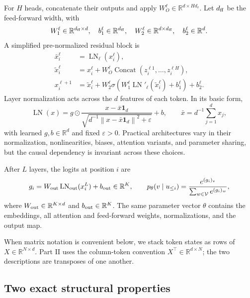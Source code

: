 \documentclass[11pt]{amsart}
\numberwithin{equation}{section}
\theoremstyle{definition}
\theoremstyle{plain}
\theoremstyle{remark}
\newcommand{\R}{\mathbb{R}}
\newcommand{\one}{\mathbf{1}}
\newcommand{\norm}[1]{\left\lVert#1\right\rVert}
\begin{document}
For $H$ heads, concatenate their outputs and apply
$W_O^\ell\in\R^{d\times Hd_v}$.  Let $d_{\rm ff}$ be the feed-forward width,
with
\[
 W_1^\ell\in\R^{d_{\rm ff}\times d},\quad
 b_1^\ell\in\R^{d_{\rm ff}},\quad
 W_2^\ell\in\R^{d\times d_{\rm ff}},\quad
 b_2^\ell\in\R^d.
\]
A simplified pre-normalized residual block is
\begin{equation}\label{eq:transformer-block}
\begin{aligned}
 \bar x_i^\ell
 &=\operatorname{LN}_\ell(x_i^\ell),\\
 \widetilde x_i^\ell
 &=x_i^\ell
   +W_O^\ell\operatorname{Concat}
      (z_i^{\ell1},\ldots,z_i^{\ell H}),\\
 x_i^{\ell+1}
 &=\widetilde x_i^\ell
   +W_{2}^\ell
     \sigma\!\left(
       W_{1}^\ell\operatorname{LN}'_\ell(\widetilde x_i^\ell)
       +b_{1}^\ell
     \right)
   +b_{2}^\ell.
\end{aligned}
\end{equation}
Layer normalization acts across the $d$ features of each token.  In its basic
form,
\[
 \operatorname{LN}(x)
 =g\odot
   \frac{x-\bar x\one_d}{\sqrt{d^{-1}\norm{x-\bar x\one_d}^2+\varepsilon}}
   +b,
 \qquad
 \bar x=d^{-1}\sum_{j=1}^d x_j,
\]
with learned $g,b\in\R^d$ and fixed $\varepsilon>0$.  Practical architectures
vary in their normalization, nonlinearities, biases, attention variants, and
parameter sharing, but the causal dependency is invariant across these
choices.

After $L$ layers, the logits at position $i$ are
\begin{equation}\label{eq:output-softmax}
 g_i=W_{\rm out}\operatorname{LN}_{\rm out}(x_i^L)+b_{\rm out}\in\R^K,
 \qquad
 p_\theta(v\mid u_{\le i})
 =\frac{e^{(g_i)_v}}{\sum_{w\in\mathcal V}e^{(g_i)_w}}, 
\end{equation}
where $W_{\rm out}\in\R^{K\times d}$ and $b_{\rm out}\in\R^K$.
The same parameter vector $\theta$ contains the embeddings, all attention and
feed-forward weights, normalizations, and the output map.

When matrix notation is convenient below, we stack token states as rows of
$X\in\R^{N\times d}$.  Part II uses the column-token convention
$X^\top\in\R^{d\times N}$; the two descriptions are transposes of one
another.

\subsection{Two exact structural properties}
\end{document}
